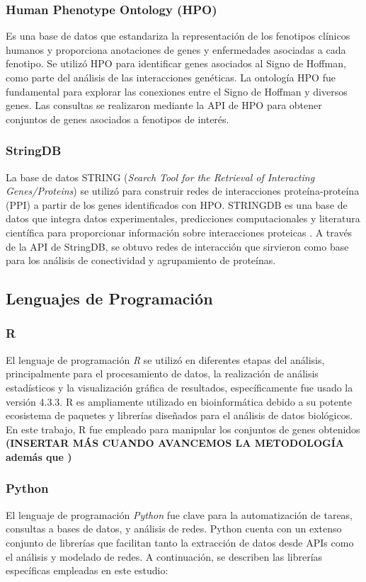 \subsubsection{Human Phenotype Ontology (HPO)}
Es una base de datos que estandariza la representación de los fenotipos clínicos humanos y proporciona anotaciones de genes y enfermedades asociadas a cada fenotipo\cite{gargano2024}. Se utilizó HPO para identificar genes asociados al Signo de Hoffman, como parte del análisis de las interacciones genéticas. La ontología HPO fue fundamental para explorar las conexiones entre el Signo de Hoffman y diversos genes. Las consultas se realizaron mediante la API de HPO para obtener conjuntos de genes asociados a fenotipos de interés.

\subsubsection{StringDB}
La base de datos STRING (\textit{Search Tool for the Retrieval of Interacting Genes/Proteins}) se utilizó para construir redes de interacciones proteína-proteína (PPI) a partir de los genes identificados con HPO. STRINGDB es una base de datos que integra datos experimentales, predicciones computacionales y literatura científica para proporcionar información sobre interacciones proteicas \cite{szklarczyk2019}. A través de la API de StringDB, se obtuvo redes de interacción que sirvieron como base para los análisis de conectividad y agrupamiento de proteínas.

\subsection{Lenguajes de Programación}

\subsubsection{R}
El lenguaje de programación \textit{R} se utilizó en diferentes etapas del análisis, principalmente para el procesamiento de datos, la realización de análisis estadísticos y la visualización gráfica de resultados, específicamente fue usado la versión 4.3.3. R es ampliamente utilizado en bioinformática debido a su potente ecosistema de paquetes y librerías diseñados para el análisis de datos biológicos\cite{chan2018}. En este trabajo, R fue empleado para manipular los conjuntos de genes obtenidos \textbf{(INSERTAR MÁS CUANDO AVANCEMOS LA METODOLOGÍA además que )}

\subsubsection{Python}
El lenguaje de programación \textit{Python} fue clave para la automatización de tareas, consultas a bases de datos, y análisis de redes. Python cuenta con un extenso conjunto de librerías que facilitan tanto la extracción de datos desde APIs como el análisis y modelado de redes. A continuación, se describen las librerías específicas empleadas en este estudio:

